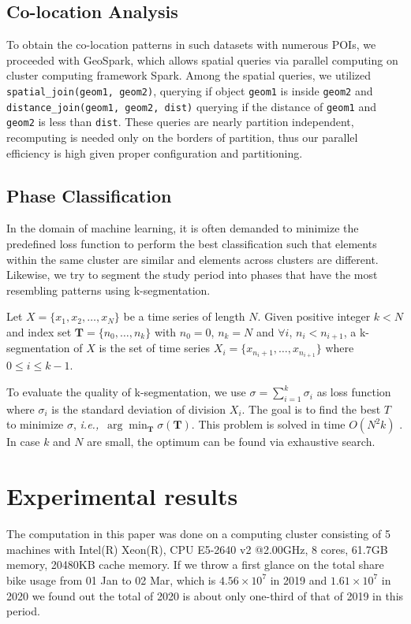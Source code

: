 \documentclass[ijgi,submit,moreauthors,pdftex]{Definitions/mdpi}
\begin{document}
\subsection{Co-location Analysis}\label{sec:co-location}
To obtain the co-location patterns in such datasets with numerous POIs, we proceeded with GeoSpark, which allows spatial queries via parallel computing on cluster computing framework Spark.
Among the spatial queries, we utilized \texttt{spatial\_join(geom1, geom2)}, querying if object \texttt{geom1} is inside \texttt{geom2} and \texttt{distance\_join(geom1, geom2, dist)} querying if the distance of \texttt{geom1} and \texttt{geom2} is less than \texttt{dist}.
These queries are nearly partition independent, recomputing is needed only on the borders of partition, thus our parallel efficiency is high given proper configuration and partitioning.

\subsection{Phase Classification}\label{sec:phase_classification}
In the domain of machine learning, it is often demanded to minimize the predefined loss function to perform the best classification such that elements within the same cluster are similar and elements across clusters are different.
Likewise, we try to segment the study period into phases that have the most resembling patterns using k-segmentation.

\begin{Definition}[k-segmentation]\label{def:k-seg}
Let $X=\{x_1,x_2,\ldots,x_N\}$ be a time series of length $N$.
Given positive integer $k<N$ and index set $\mathbf{T}=\{n_0,\ldots,n_k\}$ with $n_0=0$, $n_k=N$ and $\forall i$, $n_i<n_{i+1}$, a k-segmentation of $X$ is the set of time series $X_i=\{x_{n_i+1},\ldots,x_{n_{i+1}}\}$ where $0\leq i\leq k-1$.
\end{Definition}

To evaluate the quality of k-segmentation, we use $\sigma=\sum_{i=1}^{k}{\sigma_i}$ as loss function where $\sigma_i$ is the standard deviation of division $X_i$. 
The goal is to find the best $T$ to minimize $\sigma$, \textit{i.e.,}\ $\arg\min_{\mathbf{T}}\sigma(\mathbf{T})$.
This problem is solved in time $O(N^2k)$ \cite{terzi2006efficient}.
In case $k$ and $N$ are small, the optimum can be found via exhaustive search.


\section{Experimental results}\label{sec:experimental results}
The computation in this paper was done on a computing cluster consisting of 5 machines with Intel(R) Xeon(R), CPU E5-2640 v2 @2.00GHz, 8 cores, 61.7GB memory, 20480KB cache memory. 
If we throw a first glance on the total share bike usage from 01 Jan to 02 Mar, which is $4.56\times10^7$ in 2019 and $1.61\times10^7$ in 2020 we found out the total of 2020 is about only one-third of that of 2019 in this period.
\end{document}
